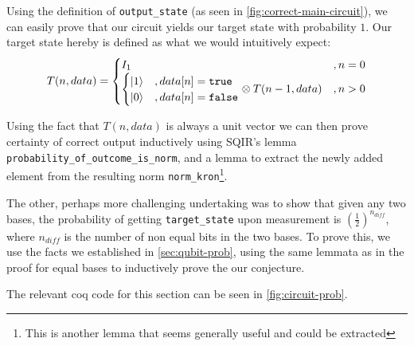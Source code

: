 \documentclass{article}
\begin{document}
Using the definition of \texttt{output\_state} (as seen in \cref{fig:correct-main-circuit}), we can easily prove that our circuit yields our target state with probability $1$. 
Our target state hereby is defined as what we would intuitively expect:
$$T(n,data) = \begin{cases}
I_1&, n =0\\
\begin{cases}
\ket{1}&, data[n] = \texttt{true}\\
\ket{0}&, data[n] = \texttt{false}
\end{cases} \otimes T(n-1,data)&, n>0
\end{cases}$$

Using the fact that $T(n,data)$ is always a unit vector we can then prove certainty of correct output inductively using SQIR's lemma \texttt{probability\_of\_outcome\_is\_norm}, and a lemma to extract the newly added element from the resulting norm \texttt{norm\_kron}\footnote{This is another lemma that seems generally useful and could be extracted}. 

The other, perhaps more challenging undertaking was to show that given any two bases, the probability of getting \texttt{target\_state} upon measurement is $(\frac{1}{2})^{n_{diff}}$, where $n_{diff}$ is the number of non equal bits in the two bases. To prove this, we use the facts we established in \cref{sec:qubit-prob}, using the same lemmata as in the proof for equal bases to inductively prove the our conjecture.

The relevant coq code for this section can be seen in \cref{fig:circuit-prob}.
\end{document}
